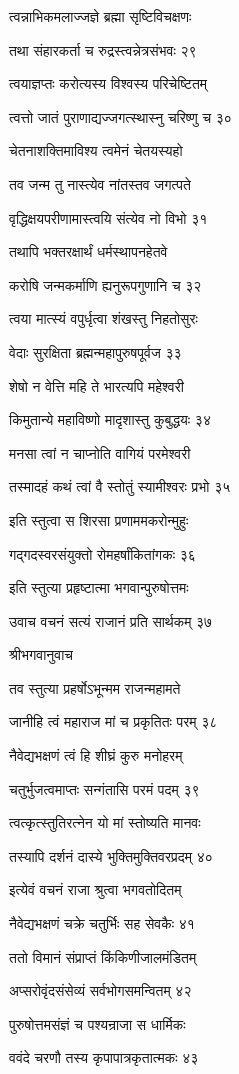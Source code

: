 त्वन्नाभिकमलाज्जज्ञे ब्रह्मा सृष्टिविचक्षणः

तथा संहारकर्ता च रुद्रस्त्वन्नेत्रसंभवः २९

त्वयाज्ञप्तः करोत्यस्य विश्वस्य परिचेष्टितम्

त्वत्तो जातं पुराणाद्यज्जगत्स्थास्नु चरिष्णु च ३०

चेतनाशक्तिमाविश्य त्वमेनं चेतयस्यहो

तव जन्म तु नास्त्येव नांतस्तव जगत्पते

वृद्धिक्षयपरीणामास्त्वयि संत्येव नो विभो ३१

तथापि भक्तरक्षार्थं धर्मस्थापनहेतवे

करोषि जन्मकर्माणि ह्यनुरूपगुणानि च ३२

त्वया मात्स्यं वपुर्धृत्वा शंखस्तु निहतोसुरः

वेदाः सुरक्षिता ब्रह्मन्महापुरुषपूर्वज ३३

शेषो न वेत्ति महि ते भारत्यपि महेश्वरी

किमुतान्ये महाविष्णो मादृशास्तु कुबुद्धयः ३४

मनसा त्वां न चाप्नोति वागियं परमेश्वरी

तस्मादहं कथं त्वां वै स्तोतुं स्यामीश्वरः प्रभो ३५

इति स्तुत्वा स शिरसा प्रणाममकरोन्मुहुः

गद्गदस्वरसंयुक्तो रोमहर्षांकितांगकः ३६

इति स्तुत्या प्रहृष्टात्मा भगवान्पुरुषोत्तमः

उवाच वचनं सत्यं राजानं प्रति सार्थकम् ३७

श्रीभगवानुवाच

तव स्तुत्या प्रहर्षोऽभून्मम राजन्महामते

जानीहि त्वं महाराज मां च प्रकृतितः परम् ३८

नैवेद्यभक्षणं त्वं हि शीघ्रं कुरु मनोहरम्

चतुर्भुजत्वमाप्तः सन्गंतासि परमं पदम् ३९

त्वत्कृत्स्तुतिरत्नेन यो मां स्तोष्यति मानवः

तस्यापि दर्शनं दास्ये भुक्तिमुक्तिवरप्रदम् ४०

इत्येवं वचनं राजा श्रुत्वा भगवतोदितम्

नैवेद्यभक्षणं चक्रे चतुर्भिः सह सेवकैः ४१

ततो विमानं संप्राप्तं किंकिणीजालमंडितम्

अप्सरोवृंदसंसेव्यं सर्वभोगसमन्वितम् ४२

पुरुषोत्तमसंज्ञं च पश्यन्राजा स धार्मिकः

ववंदे चरणौ तस्य कृपापात्रकृतात्मकः ४३

